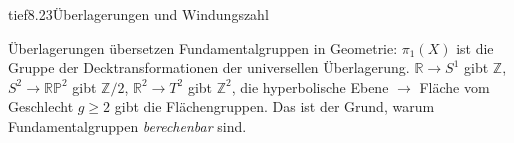 \begin{loesungkarte}{tief}{8.23}{Überlagerungen und Windungszahl}
\begin{mitnehmen}\kastentext
Überlagerungen übersetzen Fundamentalgruppen in Geometrie: $\pi_1(X)$ ist die Gruppe der Decktransformationen der universellen Überlagerung. $\mathbb R\to S^{1}$ gibt $\mathbb Z$, $S^{2}\to\mathbb{RP}^{2}$ gibt $\mathbb Z/2$, $\mathbb R^{2}\to T^{2}$ gibt $\mathbb Z^{2}$, die hyperbolische Ebene $\to$ Fläche vom Geschlecht $g\ge2$ gibt die Flächengruppen. Das ist der Grund, warum Fundamentalgruppen \emph{berechenbar} sind.
\end{mitnehmen}
\end{loesungkarte}

